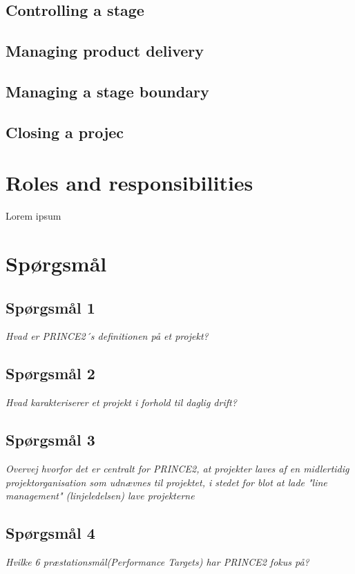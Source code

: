 \documentclass[12pt,twoside]{article}
\begin{document}
    \subsection{Controlling a stage}

    \subsection{Managing product delivery}

    \subsection{Managing a stage boundary}

    \subsection{Closing a projec}

    \newpage

    \section{Roles and responsibilities}
    Lorem ipsum

    \newpage

    \section{Spørgsmål}

    \subsection{Spørgsmål 1}
    \textit{Hvad er PRINCE2´s definitionen på et projekt?}
    \subsection{Spørgsmål 2}
    \textit{Hvad karakteriserer et projekt i forhold til daglig drift?}
    \subsection{Spørgsmål 3}
    \textit{Overvej hvorfor det er centralt for PRINCE2, at projekter laves af en midlertidig projektorganisation som udnævnes til projektet, i stedet for blot at lade "line management" (linjeledelsen) lave projekterne}
    \subsection{Spørgsmål 4}
    \textit{Hvilke 6 præstationsmål(Performance Targets) har PRINCE2 fokus på?}
\end{document}
